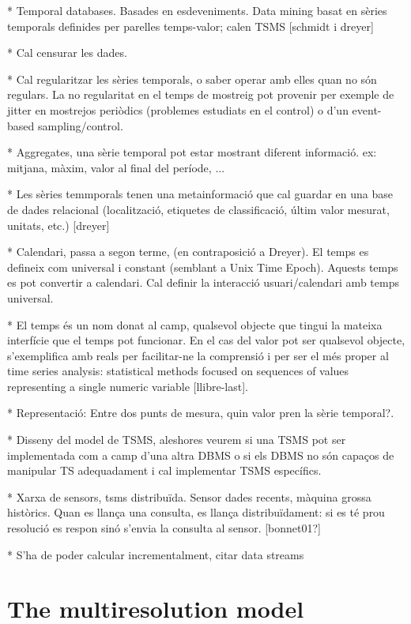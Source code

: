 \documentclass{scrartcl}
\begin{document}
* Temporal databases. Basades en esdeveniments. Data mining basat en sèries temporals definides per parelles temps-valor; calen TSMS [schmidt i dreyer] 



* Cal censurar les dades.

* Cal regularitzar les sèries temporals, o saber operar amb elles quan no són regulars. La no regularitat en el temps de mostreig pot provenir per exemple de jitter en mostrejos periòdics (problemes estudiats en el control) o d'un event-based sampling/control.


* Aggregates, una sèrie temporal pot estar mostrant diferent informació. ex: mitjana, màxim, valor al final del període, ...

* Les sèries temmporals tenen una metainformació que cal guardar en una base de dades relacional (localització, etiquetes de classificació, últim valor mesurat, unitats, etc.) [dreyer]



* Calendari, passa a segon terme, (en contraposició a Dreyer). El temps es defineix com universal i constant (semblant a Unix Time Epoch). Aquests temps es pot convertir a calendari. Cal definir la interacció usuari/calendari amb temps universal.

* El temps és un nom donat al camp, qualsevol objecte que tingui la mateixa interfície que el temps pot funcionar. En el cas del valor pot ser qualsevol objecte, s'exemplifica amb reals per facilitar-ne la comprensió i per ser el més proper al time series analysis: statistical methods focused on sequences of values representing a single numeric variable [llibre-last].




* Representació: Entre dos punts de mesura, quin valor pren la sèrie temporal?.


* Disseny del model de TSMS, aleshores veurem si una TSMS pot ser implementada com a camp d'una altra DBMS o si els DBMS no són capaços de manipular TS adequadament i cal implementar TSMS específics.

* Xarxa de sensors, tsms distribuïda. Sensor dades recents, màquina grossa històrics. Quan es llança una consulta, es llança distribuïdament: si es té prou resolució es respon sinó s'envia la consulta al sensor. [bonnet01?]

* S'ha de poder calcular incrementalment, citar data streams


\section{The multiresolution model}
\end{document}
